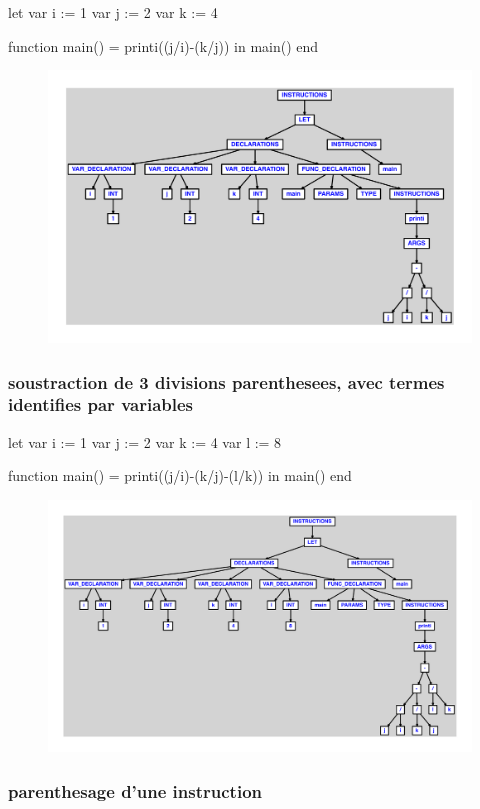 \documentclass{article}
\begin{document}
\begin{verbatimtab}
let
	var i := 1
	var j := 2
	var k := 4

	function main() = printi((j/i)-(k/j))
in main() end
\end{verbatimtab}
\begin{figure}[H]\centering\includegraphics[max width=\textwidth]{ast/ast_133.pdf}\end{figure}\subsubsection{soustraction de 3 divisions parenthesees, avec termes identifies par variables}
\begin{verbatimtab}
let
	var i := 1
	var j := 2
	var k := 4
	var l := 8

	function main() = printi((j/i)-(k/j)-(l/k))
in main() end
\end{verbatimtab}
\begin{figure}[H]\centering\includegraphics[max width=\textwidth]{ast/ast_134.pdf}\end{figure}\subsubsection{parenthesage d'une instruction}
\end{document}
